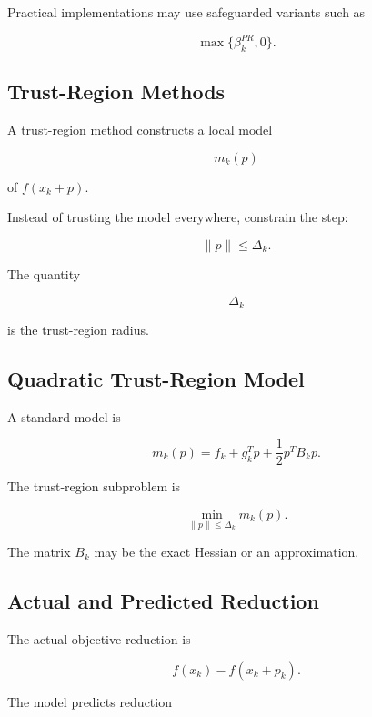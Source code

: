 Practical implementations may use safeguarded variants such as

\[
\boxed{
\max
\{
\beta_k^{PR},0
\}.
}
\]

\subsection{Trust-Region Methods}
\label{subsec:trust-region-methods}

A trust-region method constructs a local model

\[
m_k(p)
\]

of \(f(x_k+p)\).

Instead of trusting the model everywhere, constrain the step:

\[
\boxed{
\|p\|
\leq
\Delta_k.
}
\]

The quantity

\[
\Delta_k
\]

is the trust-region radius.

\subsection{Quadratic Trust-Region Model}
\label{subsec:quadratic-trust-region-model}

A standard model is

\[
\boxed{
m_k(p)
=
f_k
+
g_k^Tp
+
\frac12p^TB_kp.
}
\]

The trust-region subproblem is

\[
\boxed{
\min_{\|p\|\leq\Delta_k}
m_k(p).
}
\]

The matrix \(B_k\) may be the exact Hessian or an approximation.

\subsection{Actual and Predicted Reduction}
\label{subsec:actual-predicted-reduction}

The actual objective reduction is

\[
\boxed{
f(x_k)-f(x_k+p_k).
}
\]

The model predicts reduction

